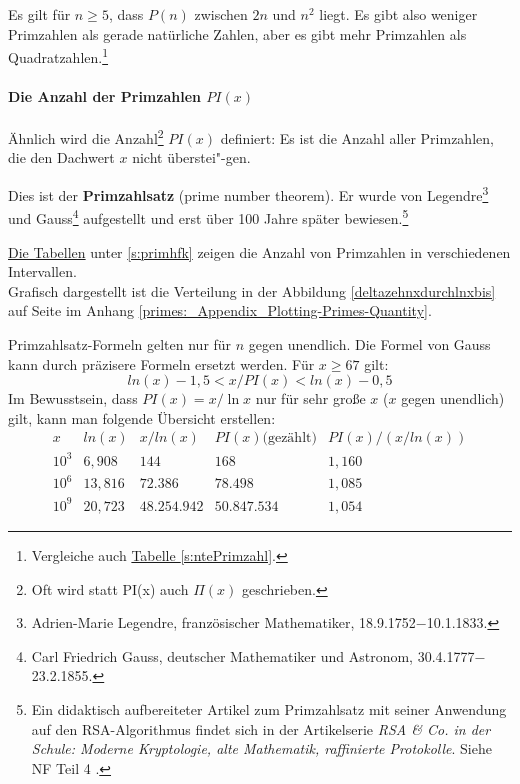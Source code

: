 \begin{refsegment}
Es gilt für $n \ge 5$, dass  $P(n)$  zwischen  $2n$  und  $n^2$  liegt.
Es gibt also weniger Primzahlen als gerade natürliche Zahlen, aber es gibt mehr Primzahlen als Quadratzahlen.\footnote{%
Vergleiche auch \hyperlink{ntePrimzahl}{Tabelle \ref{s:ntePrimzahl}}.
}


\paragraph*{Die Anzahl der Primzahlen $PI(x)$}%
%

Ähnlich wird die Anzahl\footnote{%
Oft wird statt PI(x) auch $\Pi(x)$ geschrieben.
} $PI(x)$ definiert: Es ist die Anzahl aller Primzahlen,
die den Dachwert $x$ nicht überstei"-gen.



Dies ist der  \textbf{Primzahlsatz} (prime
number theorem). Er wurde von Legendre\footnote{%
  Adrien-Marie Legendre,
  französischer Mathematiker, 18.9.1752$-$10.1.1833.
}
und Gauss\footnote{%
  Carl Friedrich Gauss,
  deutscher Mathematiker und Astronom, 30.4.1777$-$23.2.1855.
}
aufgestellt und erst über 100 Jahre später bewiesen.\footnote{
  Ein didaktisch aufbereiteter Artikel zum Primzahlsatz mit seiner
  Anwendung auf den RSA-Algorithmus findet sich in der Artikelserie
  {\em RSA \& Co. in der Schule: Moderne Kryptologie, alte Mathematik, raffinierte Protokolle}.
  Siehe NF Teil 4 \cite{Witten2010a}.
}



\hyperlink{primhfk}{Die Tabellen} unter \ref{s:primhfk} zeigen die
Anzahl von Primzahlen in verschiedenen Intervallen.\\
Grafisch dargestellt ist die Verteilung in der
Abbildung \ref{deltazehnxdurchlnxbis} auf Seite
\pageref{primes:_Appendix_subsubsection_NumberofPrimes-in-intervals}
im Anhang \ref{primes:_Appendix_Plotting-Primes-Quantity}.


Primzahlsatz-Formeln gelten nur für $n$ gegen unendlich. Die Formel von Gauss
kann durch präzisere Formeln ersetzt werden.
Für $x \geq 67$ gilt:
$$ ln(x) - 1,5 < x / PI(x) < ln(x) - 0,5 $$
Im Bewusstsein, dass $PI(x)  =  x / \ln x$ nur für sehr große $x$ ($x$ gegen unendlich) gilt, kann man
folgende Übersicht erstellen:
$$
\begin{array}{ccccc}
x     &  ln(x)  &  x / ln(x) & PI(x)\mbox{(gezählt)} &       PI(x) / (x/ln(x)) \\
10^3  &  6,908  &   144      &  168        &       1,160 \\
10^6  &  13,816 &   72.386    &  78.498          &       1,085 \\
10^9  & 20,723  &   48.254.942 &  50.847.534       &       1,054
\end{array}
$$


\end{refsegment}
